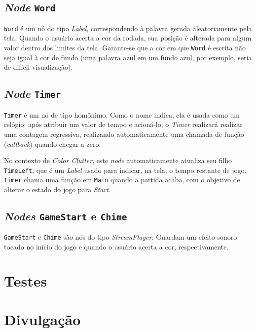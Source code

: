 
\subsection{\textit{Node} \texttt{Word}}

\texttt{Word} é um nó do tipo \textit{Label}, correspondendo à palavra gerada aleatoriamente pela tela. Quando o usuário acerta a cor da rodada, sua posição é alterada para algum valor dentro dos limites da tela. Garante-se que a cor em que \texttt{Word} é escrita não seja igual à cor de fundo (uma palavra azul em um fundo azul, por exemplo, seria de difícil visualização).


\subsection{\textit{Node} \texttt{Timer}}

\texttt{Timer} é um nó de tipo homônimo. Como o nome indica, ela é usada como um relógio: após atribuir um valor de tempo e acioná-lo, o \textit{Timer} realizará realizar uma contagem regressiva, realizando automaticamente uma chamada de função (\textit{callback}) quando chegar a zero.

No contexto de \textit{Color Clutter}, este \textit{node} automaticamente atualiza seu filho \texttt{TimeLeft}, que é um \textit{Label} usado para indicar, na tela, o  tempo restante de jogo. \texttt{Timer} chama uma função em \texttt{Main} quando a partida acaba, com o objetivo de alterar o estado do jogo para \textit{Start}.


\subsection{\textit{Nodes} \texttt{GameStart} e \texttt{Chime}}

\texttt{GameStart} e \texttt{Chime} são nós do tipo \textit{StreamPlayer}. Guardam um efeito sonoro tocado no início do jogo e quando o usuário acerta a cor, respectivamente.


\section{Testes}


\section{Divulgação}
